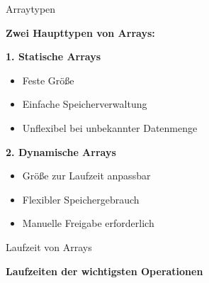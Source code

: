 \documentclass[aspectratio=169,xcolor=dvipsnames, t]{beamer}
\begin{document}
\begin{frame}{Arraytypen}

\textbf{Zwei Haupttypen von Arrays:}

\vspace{0.5cm}

\textbf{1. Statische Arrays}
\begin{itemize}
    \renewcommand{\labelitemi}{--}
    \item Feste Größe 
    \item Einfache Speicherverwaltung
    \item Unflexibel bei unbekannter Datenmenge
\end{itemize}

\vspace{0.4cm}

\textbf{2. Dynamische Arrays}
\begin{itemize}
    \renewcommand{\labelitemi}{--}
    \item Größe zur Laufzeit anpassbar
    \item Flexibler Speichergebrauch
    \item Manuelle Freigabe erforderlich
\end{itemize}

\end{frame}
\begin{frame}{Laufzeit von Arrays}

\centering
\textbf{Laufzeiten der wichtigsten Operationen}

\vspace{0.5cm}

\renewcommand{\arraystretch}{1.3}
\end{frame}
\end{document}
